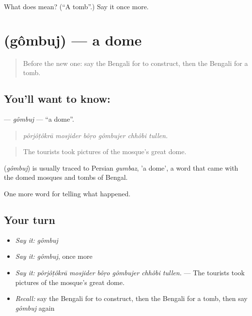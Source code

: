 \begin{tcolorbox}[breakable,colback=teal!4,colframe=teal!35!black,title={Before you move on}]
What does  mean? (\textquotedblleft{}A tomb\textquotedblright{}.) Say it once more.
\end{tcolorbox}
\section[\texorpdfstring{\bn{গম্বুজ} (gômbuj)}{গম্বুজ (gômbuj)}]{ (gômbuj) — a dome}

\label{lesson:BN-C320-gombuj}



\begin{quote}
Before the new one: say the Bengali for to construct, then the Bengali for a tomb.
\end{quote}

\subsection*{You'll want to know: }
\textbf{} — \emph{gômbuj} — \textquotedblleft{}a dome\textquotedblright{}.

\begin{quote}
     
\end{quote}

\begin{quote}
\emph{pôrjôṭôkrā mosjider bôṛo gômbujer chhôbi tullen.}
\end{quote}

\begin{quote}
The tourists took pictures of the mosque's great dome.
\end{quote}

\begin{cousinweb}
\textbf{} (\emph{gômbuj}) is usually traced to Persian \emph{gumbaz}, 'a dome', a word that came with the domed mosques and tombs of Bengal.
\end{cousinweb}

\begin{grammarlens}[title={What you've built}]
One more word for telling what happened.
\end{grammarlens}

\subsection*{Your turn}
\begin{itemize}
\raggedright
  \item \emph{Say it:} \emph{gômbuj}
  \item \emph{Say it:} \emph{gômbuj}, once more
  \item \emph{Say it:} \emph{pôrjôṭôkrā mosjider bôṛo gômbujer chhôbi tullen.} — The tourists took pictures of the mosque's great dome.
  \item \emph{Recall:} say the Bengali for to construct, then the Bengali for a tomb, then say \emph{gômbuj} again
\end{itemize}

